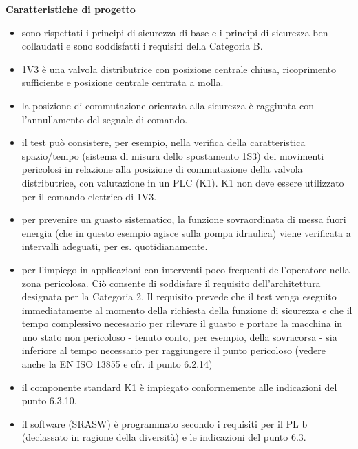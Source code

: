 \textbf{Caratteristiche di progetto}
\begin{itemize}
    \item sono rispettati i principi di sicurezza di base e i principi di sicurezza ben collaudati e sono soddisfatti i requisiti della Categoria B.
    \item 1V3 è una valvola distributrice con posizione centrale chiusa, ricoprimento sufficiente e posizione centrale centrata a molla.
    \item la posizione di commutazione orientata alla sicurezza è raggiunta con l'annullamento del segnale di comando.
    \item il test può consistere, per esempio, nella verifica della caratteristica spazio/tempo (sistema di misura dello spostamento 1S3) dei movimenti pericolosi in relazione alla posizione di commutazione della valvola distributrice, con valutazione in un PLC (K1). K1 non deve essere utilizzato per il comando elettrico di 1V3.
    \item per prevenire un guasto sistematico, la funzione sovraordinata di messa fuori energia (che in questo esempio agisce sulla pompa idraulica) viene verificata a intervalli adeguati, per es. quotidianamente.
    \item per l'impiego in applicazioni con interventi poco frequenti dell'operatore nella zona pericolosa. Ciò consente di soddisfare il requisito dell'architettura designata per la Categoria 2. Il requisito prevede che il test venga eseguito immediatamente al momento della richiesta della funzione di sicurezza e che il tempo complessivo necessario per rilevare il guasto e portare la macchina in uno stato non pericoloso - tenuto conto, per esempio, della sovracorsa - sia inferiore al tempo necessario per raggiungere il punto pericoloso (vedere anche la EN ISO 13855 e cfr. il punto 6.2.14)
    \item il componente standard K1 è impiegato conformemente alle indicazioni del punto 6.3.10.
    \item il software (SRASW) è programmato secondo i requisiti per il PL b (declassato in ragione della diversità) e le indicazioni del punto 6.3.
\end{itemize}

